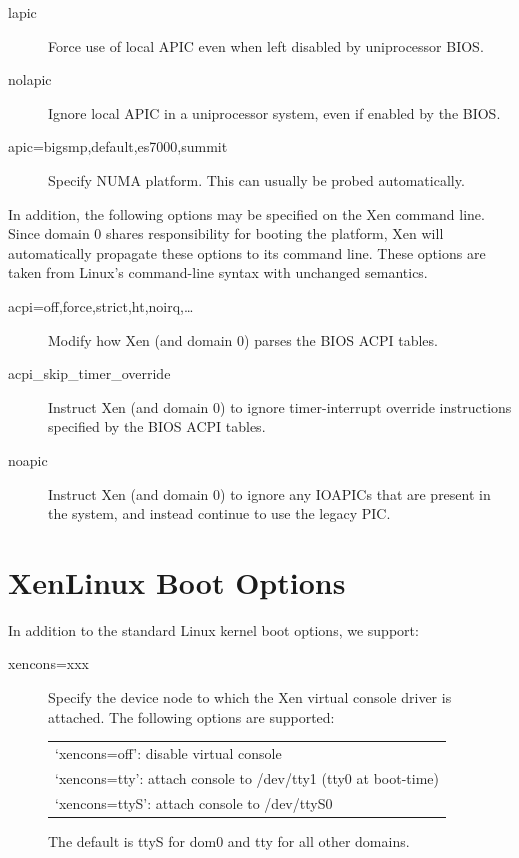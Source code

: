 \documentclass[11pt,twoside,final,openright]{report}
\begin{document}
{\begin{description}
\item [lapic ]
 Force use of local APIC even when left disabled by uniprocessor BIOS.

\item [nolapic ]
 Ignore local APIC in a uniprocessor system, even if enabled by the BIOS.

\item [apic=bigsmp,default,es7000,summit ]
 Specify NUMA platform. This can usually be probed automatically.

\end{description} 

In addition, the following options may be specified on the Xen command
line. Since domain 0 shares responsibility for booting the platform,
Xen will automatically propagate these options to its command
line. These options are taken from Linux's command-line syntax with
unchanged semantics.

\begin{description}
\item [acpi=off,force,strict,ht,noirq,\ldots ] 
 Modify how Xen (and domain 0) parses the BIOS ACPI tables.

\item [acpi\_skip\_timer\_override ]
 Instruct Xen (and domain 0) to ignore timer-interrupt override
 instructions specified by the BIOS ACPI tables.

\item [noapic ]
 Instruct Xen (and domain 0) to ignore any IOAPICs that are present in
 the system, and instead continue to use the legacy PIC.

\end{description} 

\section{XenLinux Boot Options}

In addition to the standard Linux kernel boot options, we support: 
\begin{description} 
\item[xencons=xxx ] Specify the device node to which the Xen virtual
console driver is attached. The following options are supported:
\begin{center}
\begin{tabular}{l}
`xencons=off': disable virtual console \\ 
`xencons=tty': attach console to /dev/tty1 (tty0 at boot-time) \\
`xencons=ttyS': attach console to /dev/ttyS0
\end{tabular}
\end{center}
The default is ttyS for dom0 and tty for all other domains.
\end{description} 



}
\end{document}
